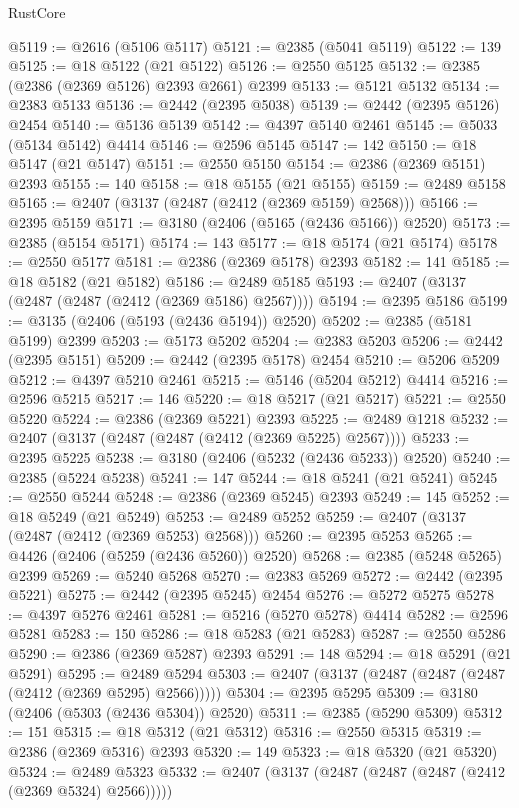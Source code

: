 \begin{lexlean}{RustCore}
\begin{coremodule}
@5119 := @2616 (@5106 @5117)
@5121 := @2385 (@5041 @5119)
@5122 := 139
@5125 := @18 @5122 (@21 @5122)
@5126 := @2550 @5125
@5132 := @2385 (@2386 (@2369 @5126) @2393 @2661) @2399
@5133 := @5121 @5132
@5134 := @2383 @5133
@5136 := @2442 (@2395 @5038)
@5139 := @2442 (@2395 @5126) @2454
@5140 := @5136 @5139
@5142 := @4397 @5140 @2461
@5145 := @5033 (@5134 @5142) @4414
@5146 := @2596 @5145
@5147 := 142
@5150 := @18 @5147 (@21 @5147)
@5151 := @2550 @5150
@5154 := @2386 (@2369 @5151) @2393
@5155 := 140
@5158 := @18 @5155 (@21 @5155)
@5159 := @2489 @5158
@5165 := @2407 (@3137 (@2487 (@2412 (@2369 @5159) @2568)))
@5166 := @2395 @5159
@5171 := @3180 (@2406 (@5165 (@2436 @5166)) @2520)
@5173 := @2385 (@5154 @5171)
@5174 := 143
@5177 := @18 @5174 (@21 @5174)
@5178 := @2550 @5177
@5181 := @2386 (@2369 @5178) @2393
@5182 := 141
@5185 := @18 @5182 (@21 @5182)
@5186 := @2489 @5185
@5193 := @2407 (@3137 (@2487 (@2487 (@2412 (@2369 @5186) @2567))))
@5194 := @2395 @5186
@5199 := @3135 (@2406 (@5193 (@2436 @5194)) @2520)
@5202 := @2385 (@5181 @5199) @2399
@5203 := @5173 @5202
@5204 := @2383 @5203
@5206 := @2442 (@2395 @5151)
@5209 := @2442 (@2395 @5178) @2454
@5210 := @5206 @5209
@5212 := @4397 @5210 @2461
@5215 := @5146 (@5204 @5212) @4414
@5216 := @2596 @5215
@5217 := 146
@5220 := @18 @5217 (@21 @5217)
@5221 := @2550 @5220
@5224 := @2386 (@2369 @5221) @2393
@5225 := @2489 @1218
@5232 := @2407 (@3137 (@2487 (@2487 (@2412 (@2369 @5225) @2567))))
@5233 := @2395 @5225
@5238 := @3180 (@2406 (@5232 (@2436 @5233)) @2520)
@5240 := @2385 (@5224 @5238)
@5241 := 147
@5244 := @18 @5241 (@21 @5241)
@5245 := @2550 @5244
@5248 := @2386 (@2369 @5245) @2393
@5249 := 145
@5252 := @18 @5249 (@21 @5249)
@5253 := @2489 @5252
@5259 := @2407 (@3137 (@2487 (@2412 (@2369 @5253) @2568)))
@5260 := @2395 @5253
@5265 := @4426 (@2406 (@5259 (@2436 @5260)) @2520)
@5268 := @2385 (@5248 @5265) @2399
@5269 := @5240 @5268
@5270 := @2383 @5269
@5272 := @2442 (@2395 @5221)
@5275 := @2442 (@2395 @5245) @2454
@5276 := @5272 @5275
@5278 := @4397 @5276 @2461
@5281 := @5216 (@5270 @5278) @4414
@5282 := @2596 @5281
@5283 := 150
@5286 := @18 @5283 (@21 @5283)
@5287 := @2550 @5286
@5290 := @2386 (@2369 @5287) @2393
@5291 := 148
@5294 := @18 @5291 (@21 @5291)
@5295 := @2489 @5294
@5303 := @2407 (@3137 (@2487 (@2487 (@2487 (@2412 (@2369 @5295) @2566)))))
@5304 := @2395 @5295
@5309 := @3180 (@2406 (@5303 (@2436 @5304)) @2520)
@5311 := @2385 (@5290 @5309)
@5312 := 151
@5315 := @18 @5312 (@21 @5312)
@5316 := @2550 @5315
@5319 := @2386 (@2369 @5316) @2393
@5320 := 149
@5323 := @18 @5320 (@21 @5320)
@5324 := @2489 @5323
@5332 := @2407 (@3137 (@2487 (@2487 (@2487 (@2412 (@2369 @5324) @2566)))))

\end{coremodule}
\end{lexlean}
